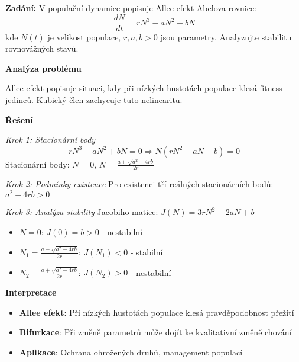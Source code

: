 \begin{example}
\label{ex:allee-efekt}

\noindent\textbf{Zadání:} V populační dynamice popisuje Allee efekt Abelova rovnice:
\[
\frac{dN}{dt} = rN^3 - aN^2 + bN
\]
kde $N(t)$ je velikost populace, $r, a, b > 0$ jsou parametry. Analyzujte stabilitu rovnovážných stavů.

\vspace{1.5\baselineskip}

\noindent\textbf{Analýza problému}

Allee efekt popisuje situaci, kdy při nízkých hustotách populace klesá fitness jedinců. Kubický člen zachycuje tuto nelinearitu.

\vspace{1.5\baselineskip}

\noindent\textbf{Řešení}

\noindent\textit{Krok 1: Stacionární body}
\[
rN^3 - aN^2 + bN = 0 \Rightarrow N(rN^2 - aN + b) = 0
\]
Stacionární body: $N = 0$, $N = \frac{a \pm \sqrt{a^2 - 4rb}}{2r}$

\vspace{1\baselineskip}

\noindent\textit{Krok 2: Podmínky existence}
Pro existenci tří reálných stacionárních bodů: $a^2 - 4rb > 0$

\vspace{1\baselineskip}

\noindent\textit{Krok 3: Analýza stability}
Jacobiho matice: $J(N) = 3rN^2 - 2aN + b$
\begin{itemize}
\item $N = 0$: $J(0) = b > 0$ - nestabilní
\item $N_1 = \frac{a - \sqrt{a^2 - 4rb}}{2r}$: $J(N_1) < 0$ - stabilní
\item $N_2 = \frac{a + \sqrt{a^2 - 4rb}}{2r}$: $J(N_2) > 0$ - nestabilní
\end{itemize}

\vspace{1.5\baselineskip}

\noindent\textbf{Interpretace}
\begin{itemize}
\item \textbf{Allee efekt}: Při nízkých hustotách populace klesá pravděpodobnost přežití
\item \textbf{Bifurkace}: Při změně parametrů může dojít ke kvalitativní změně chování
\item \textbf{Aplikace}: Ochrana ohrožených druhů, management populací
\end{itemize}

\end{example}

